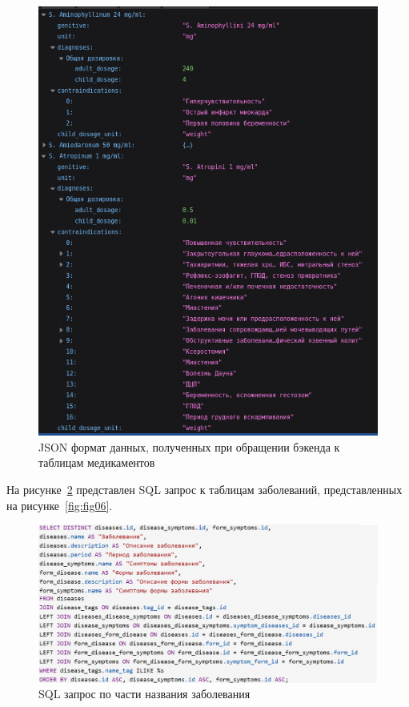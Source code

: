 \begin{figure}
  \includegraphics[scale=1.1]{inc/json_sh_all_med1}
  \caption{JSON формат данных, полученных при обращении бэкенда к таблицам медикаментов}
  \label{fig:fig23}
\end{figure}

На рисунке~\ref{fig:fig24} представлен SQL запрос к таблицам заболеваний, представленных на рисунке~\ref{fig:fig06}.

\begin{figure}
  \includegraphics[scale=0.82]{inc/json_sh_dis_part_name}
  \caption{SQL запрос по части названия заболевания}
  \label{fig:fig24}
\end{figure}

